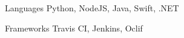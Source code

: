 
\begin{cvskills}
  \cvskill
    {Languages} %
    {Python, NodeJS, Java, Swift, .NET} %

  \cvskill
    {Frameworks} %
    {Travis CI, Jenkins, Oclif} %
\end{cvskills}
